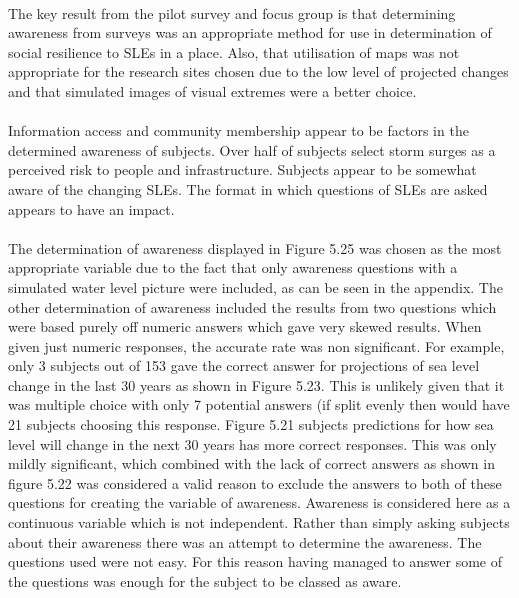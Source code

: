 \paragraph{}
The key result from the pilot survey and focus group is that determining awareness from surveys was an appropriate method for use in determination of social resilience to SLEs in a place. Also, that utilisation of maps was not appropriate for the research sites chosen due to the low level of projected changes and that simulated images of visual extremes were a better choice.
\paragraph{}
Information access and community membership appear to be factors in the determined awareness of subjects. Over half of subjects select storm surges as a perceived risk to people and infrastructure. Subjects appear to be somewhat aware of the changing SLEs. The format in which questions of SLEs are asked appears to have an impact. 

\paragraph{}
The determination of awareness displayed in Figure 5.25 was chosen as the most appropriate variable due to the fact that only awareness questions with a simulated water level picture were included, as can be seen in the appendix. The other determination of awareness included the results from two questions which were based purely off numeric answers which gave very skewed results. When given just numeric responses, the accurate rate was non significant. For example, only 3 subjects out of 153 gave the correct answer for projections of sea level change in the last 30 years as shown in Figure 5.23.  This is unlikely given that it was multiple choice with only 7 potential answers (if split evenly then would have 21 subjects choosing this response. Figure 5.21 subjects predictions for how sea level will change in the next 30 years has more correct responses. This was only mildly significant, which combined with the lack of correct answers as shown in figure 5.22 was considered a valid reason to exclude the answers to both of these questions for creating the variable of awareness. Awareness is considered here as a continuous variable which is not independent. Rather than simply asking subjects about their awareness there was an attempt to determine the awareness. The questions used were not easy. For this reason having managed to answer some of the questions was enough for the subject to be classed as aware.

